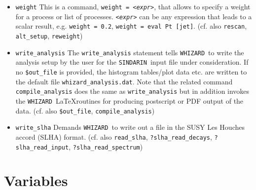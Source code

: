\documentclass[12pt]{book}
\newcommand{\ttt}[1]{\texttt{#1}}
\newcommand{\whizard}{\ttt{WHIZARD}}
\newcommand{\sindarin}{\ttt{SINDARIN}}
\begin{document}
\begin{itemize}
\begin{figure}
\begin{Verbatim}[frame=single]
    unstable Z (zee, zuu)
 \end{Verbatim}
  \caption{\label{fig:ex_unstable} \sindarin\ input file for unstable
    particles and inclusive decays.}
\end{figure}
decay channels as \ttt{unstable {\em <mother>} ({\em <decay1>}, {\em <decay2>}, ....)},
where \ttt{mother} is the mother particle, and the argument is a list
of decay channels. Note that -- unless the \ttt{?auto\_decays = true}
flag has been set -- these decay channels have to be provided by the
user as  in the example in Fig. \ref{fig:ex_unstable}. First, the $Z$
decays to electrons and up quarks are generated, then $ZZ$ production
at a 500 GeV ILC is called, and then both $Z$s are decayed according
to the probability distribution of the two generated decay matrix
elements. This obviously allows also for inclusive decays.
(cf. also \ttt{stable}, \ttt{?auto\_decays})
\item
\ttt{weight} \newline
This is a command, \ttt{weight = {\em <expr>}}, that allows to specify a
weight for a process or list of processes. \ttt{{\em <expr>}} can be
any expression that leads to a scalar result, e.g. \ttt{weight = 0.2},
\ttt{weight = eval Pt [jet]}.  (cf. also \ttt{rescan},
\ttt{alt\_setup}, \ttt{reweight})
\item
\ttt{write\_analysis} \newline
The \ttt{write\_analysis} statement tells \whizard\ to write the
analysis setup by the user for the \sindarin\ input file under
consideration. If no \ttt{\$out\_file} is provided, the histogram
tables/plot data etc. are written to the default file
\ttt{whizard\_analysis.dat}. Note that the related command
\ttt{compile\_analysis} does the same as \ttt{write\_analysis} but in
addition invokes the \whizard\ \LaTeX routines for producing
postscript or PDF output of the data.
(cf. also \ttt{\$out\_file}, \ttt{compile\_analysis})
\item
\ttt{write\_slha} \newline
Demands \whizard\ to write out a file in the SUSY Les Houches accord
(SLHA) format. (cf. also \ttt{read\_slha}, \ttt{?slha\_read\_decays},
\ttt{?slha\_read\_input}, \ttt{?slha\_read\_spectrum})
\end{itemize}
\section{Variables}
\end{document}
